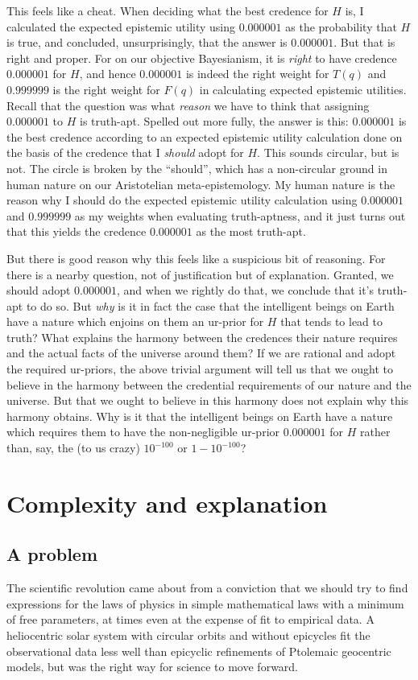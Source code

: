 This feels like a cheat. When deciding what the best credence for $H$ is, I calculated the expected
epistemic utility using $0.000001$ as the probability that $H$ is true, and concluded, unsurprisingly, 
that the answer is $0.000001$. But that is right and proper. For on our objective Bayesianism, it is
\textit{right} to have credence $0.000001$ for $H$, and hence $0.000001$ is indeed the right weight for 
$T(q)$ and $0.999999$ is the right weight for $F(q)$ in calculating expected epistemic utilities.
Recall that the question was what \textit{reason} we have to think that assigning $0.000001$
to $H$ is truth-apt. Spelled out more fully, the answer is this: $0.000001$ is the best credence according
to an expected epistemic utility calculation done on the basis of the credence that I 
\textit{should} adopt for $H$. This sounds circular, but is not. The circle is broken by the 
``should'', which has a non-circular ground in human nature on our Aristotelian meta-epistemology.
My human nature is the reason why I should do the expected epistemic utility calculation using
$0.000001$ and $0.999999$ as my weights when evaluating truth-aptness, and it just turns out that this
yields the credence $0.000001$ as the most truth-apt.

But there is good reason why this feels like a suspicious bit of reasoning. For there is a nearby 
question, not of justification but of explanation. Granted, we should adopt $0.000001$, and when we 
rightly do that, we conclude that it's truth-apt to do so. But \textit{why} is it in fact the case
that the intelligent beings on Earth have a nature which enjoins on them an ur-prior for $H$ 
that tends to lead to truth? What explains the harmony between the credences their nature requires
and the actual facts of the universe around them? If we are rational and adopt the required
ur-priors, the above trivial argument will tell us that we ought to believe in the harmony between
the credential requirements of our nature and the universe. But that we ought to believe in this
harmony does not explain why this harmony obtains. Why is it that the intelligent beings on Earth
have a nature which requires them to have the non-negligible ur-prior $0.000001$ for $H$ rather than, say,
the (to us crazy) $10^{-100}$ or $1-10^{-100}$? 

\section{Complexity and explanation}\label{sec:hierarchy}
\subsection{A problem}
The scientific revolution came about from a conviction that we should try to find expressions for the laws
of physics in simple mathematical laws with a minimum of free parameters, at times even at the expense of fit 
to empirical data. A heliocentric solar system with circular orbits and without epicycles fit the observational 
data less well than epicyclic refinements of Ptolemaic geocentric models, but was the right way for science to 
move forward. 


